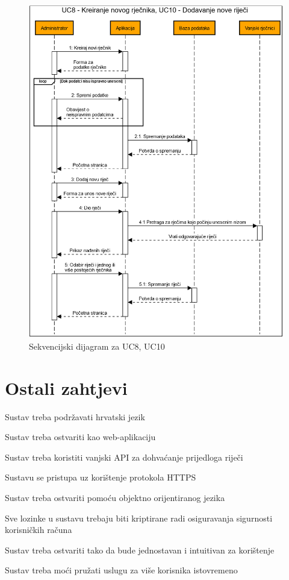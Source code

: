				\begin{figure}[H]
					\includegraphics[width=\textwidth]{slike/UC8,UC10.PNG}
					\caption{Sekvencijski dijagram za UC8, UC10}
					\label{fig:sekv4}
				\end{figure} \newpage
	
		\section{Ostali zahtjevi}
		
			\begin{packed_enum}
				
				\item Sustav treba podržavati hrvatski jezik
				\item Sustav treba ostvariti kao web-aplikaciju
				\item Sustav treba koristiti vanjski API za dohvaćanje prijedloga riječi
				\item Sustavu se pristupa uz korištenje protokola HTTPS
				\item Sustav treba ostvariti pomoću objektno orijentiranog jezika
				\item Sve lozinke u sustavu trebaju biti kriptirane radi osiguravanja sigurnosti korisničkih računa
				\item Sustav treba ostvariti tako da bude jednostavan i intuitivan za korištenje
				\item Sustav treba moći pružati uslugu za više korisnika istovremeno
				
			\end{packed_enum}
		
